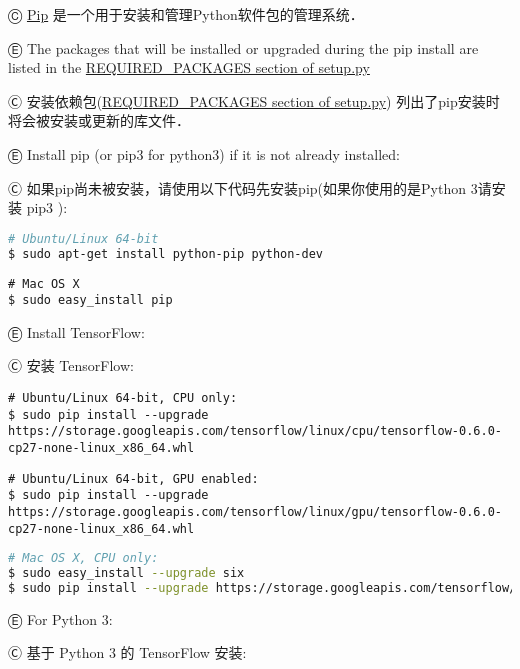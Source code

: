 Ⓒ \href{https://en.wikipedia.org/wiki/Pip_(package_manager)}{Pip} 是一个用于安装和管理Python软件包的管理系统．

Ⓔ \textcolor{etc}{The packages that will be installed or upgraded during the pip install are listed in the \href{https://github.com/tensorflow/tensorflow/blob/master/tensorflow/tools/pip_package/setup.py}{REQUIRED\_PACKAGES section of setup.py}}

Ⓒ 安装依赖包(\href{https://github.com/tensorflow/tensorflow/blob/master/tensorflow/tools/pip_package/setup.py}{REQUIRED\_PACKAGES section of setup.py}) 列出了pip安装时将会被安装或更新的库文件．

Ⓔ \textcolor{etc}{Install pip (or pip3 for python3) if it is not already installed:}

Ⓒ 如果pip尚未被安装，请使用以下代码先安装pip(如果你使用的是Python 3请安装 pip3 ):

\begin{lstlisting}[language = bash]
# Ubuntu/Linux 64-bit
$ sudo apt-get install python-pip python-dev
\end{lstlisting}

\begin{lstlisting}
# Mac OS X
$ sudo easy_install pip
\end{lstlisting}

Ⓔ \textcolor{etc}{Install TensorFlow:}

Ⓒ 安装 TensorFlow:

\begin{lstlisting}
# Ubuntu/Linux 64-bit, CPU only:
$ sudo pip install --upgrade https://storage.googleapis.com/tensorflow/linux/cpu/tensorflow-0.6.0-cp27-none-linux_x86_64.whl
\end{lstlisting}

\begin{lstlisting}
# Ubuntu/Linux 64-bit, GPU enabled:
$ sudo pip install --upgrade https://storage.googleapis.com/tensorflow/linux/gpu/tensorflow-0.6.0-cp27-none-linux_x86_64.whl
\end{lstlisting}

\begin{lstlisting}[language = bash]
# Mac OS X, CPU only:
$ sudo easy_install --upgrade six
$ sudo pip install --upgrade https://storage.googleapis.com/tensorflow/mac/tensorflow-0.6.0-py2-none-any.whl
\end{lstlisting}

Ⓔ \textcolor{etc}{For Python 3:}

Ⓒ 基于 Python 3 的 TensorFlow 安装:

